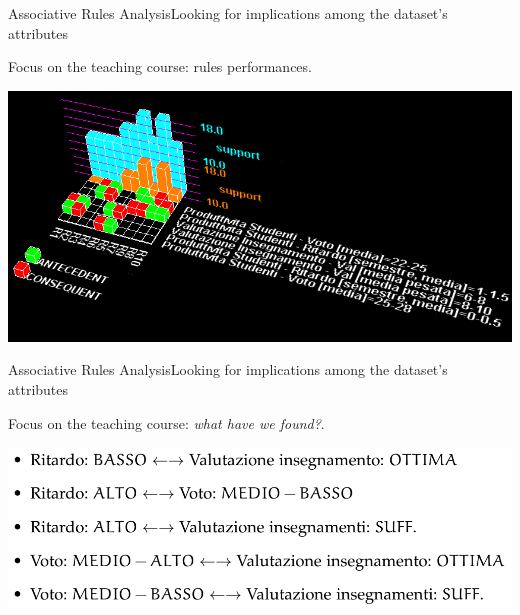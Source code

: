 \begin{frame}{Associative Rules Analysis}{Looking for implications among the dataset's attributes}

    \vspace{0.2cm}
    Focus on the \alert{teaching course}: rules performances.
    \vspace{0.2cm}

    \begin{centering}
        \includegraphics[scale=0.36]{../ass/apriori_min_1.png}
    \end{centering}

\end{frame}

\begin{frame}{Associative Rules Analysis}{Looking for implications among the dataset's attributes}

    Focus on the \alert{teaching course}: \emph{what have we found?}.

    \vspace{0.5cm}
    \begin{centering}
        \hspace{0.5cm}\includegraphics[scale=0.30]{ass1.png}
    \end{centering}

\end{frame}

